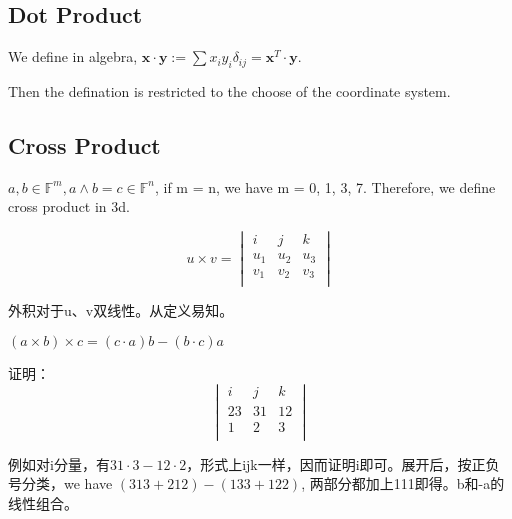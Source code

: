 \documentclass[UTF8]{../../09-Mathematics}
\begin{document}
\subsection{Dot Product}

We define in algebra, $ \boldsymbol{x} \cdot \boldsymbol{y} := \sum{x_iy_i \delta _{ij}} = \boldsymbol{x}^T \cdot \boldsymbol{y}$.

Then the defination is restricted to the choose of the coordinate system. 


\subsection{Cross Product}

$a, b \in \mathbb F^m, a \wedge b = c \in \mathbb F^n $, if m = n, we have m = 0, 1, 3, 7. Therefore, we define cross product in 3d.

\begin{equation}
  u \times  v = 
  \begin{vmatrix}
     i & j & k\\
     u_1 & u_2 & u_3\\
     v_1 & v_2 & v_3\\
  \end{vmatrix}
\end{equation}


\begin{proposition}
  外积对于u、v双线性。从定义易知。
\end{proposition}

\begin{proposition}
  $(a \times b) \times c =  (c \cdot a) b -  (b \cdot c) a   $

  证明：
  \begin{equation}
    \begin{vmatrix}
       i & j & k\\
       23 & 31 & 12\\
       1 & 2 & 3\\
    \end{vmatrix}
  \end{equation}
\end{proposition}
例如对i分量，有$31 \cdot 3-12\cdot2$，形式上ijk一样，因而证明i即可。展开后，按正负号分类，we have $(313+212) - (133+122)$, 两部分都加上111即得。b和-a的线性组合。
\end{document}

